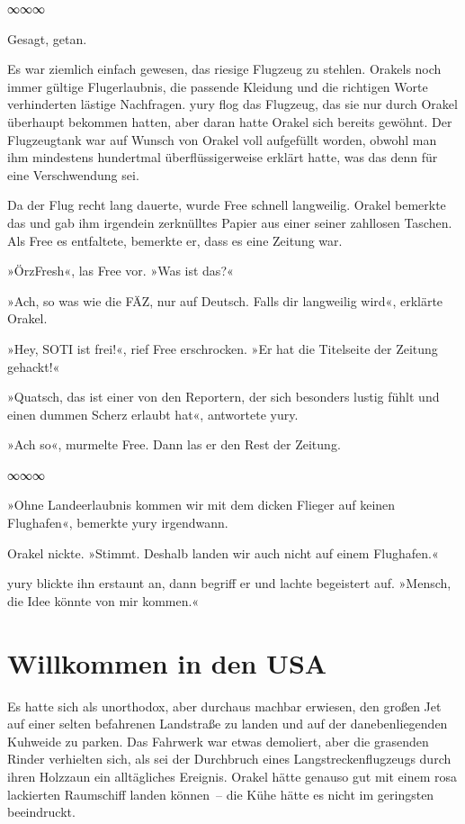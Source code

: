 \begin{center}
    ∞∞∞
\end{center}

Gesagt, getan.

Es war ziemlich einfach gewesen, das riesige Flugzeug zu stehlen. Orakels noch immer gültige Flugerlaubnis, die passende Kleidung und die richtigen Worte verhinderten lästige Nachfragen. yury flog das Flugzeug, das sie nur durch Orakel überhaupt bekommen hatten, aber daran hatte Orakel sich bereits gewöhnt. Der Flugzeugtank war auf Wunsch von Orakel voll aufgefüllt worden, obwohl man ihm mindestens hundertmal überflüssigerweise erklärt hatte, was das denn für eine Verschwendung sei.

Da der Flug recht lang dauerte, wurde Free schnell langweilig. Orakel bemerkte das und gab ihm irgendein zerknülltes Papier aus einer seiner zahllosen Taschen. Als Free es entfaltete, bemerkte er, dass es eine Zeitung war.

»ÖrzFresh«, las Free vor. »Was ist das?«

»Ach, so was wie die FÄZ, nur auf Deutsch. Falls dir langweilig wird«, erklärte Orakel.

»Hey, SOTI ist frei!«, rief Free erschrocken. »Er hat die Titelseite der Zeitung gehackt!«

»Quatsch, das ist einer von den Reportern, der sich besonders lustig fühlt und einen dummen Scherz erlaubt hat«, antwortete yury.

»Ach so«, murmelte Free. Dann las er den Rest der Zeitung.

\begin{center}
    ∞∞∞
\end{center}

»Ohne Landeerlaubnis kommen wir mit dem dicken Flieger auf keinen Flughafen«, bemerkte yury irgendwann.

Orakel nickte. »Stimmt. Deshalb landen wir auch nicht auf einem Flughafen.«

yury blickte ihn erstaunt an, dann begriff er und lachte begeistert auf. »Mensch, die Idee könnte von mir kommen.«


\chapter{Willkommen in den USA}

Es hatte sich als unorthodox, aber durchaus machbar erwiesen, den großen Jet auf einer selten befahrenen Landstraße zu landen und auf der danebenliegenden Kuhweide zu parken. Das Fahrwerk war etwas demoliert, aber die grasenden Rinder verhielten sich, als sei der Durchbruch eines Langstreckenflugzeugs durch ihren Holzzaun ein alltägliches Ereignis. Orakel hätte genauso gut mit einem rosa lackierten Raumschiff landen können~– die Kühe hätte es nicht im geringsten beeindruckt.


